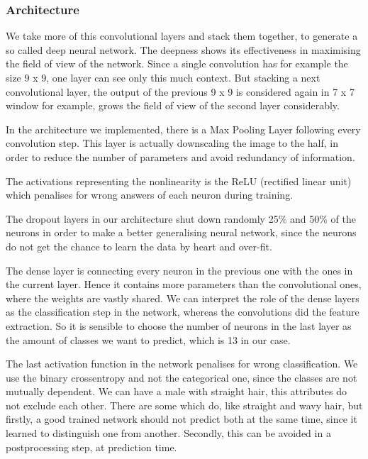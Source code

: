 \documentclass[12.5pt]{scrartcl}
\begin{document}
	\subsubsection{Architecture}
	We take more of this convolutional layers and stack them together, to generate a so called deep neural network. The deepness shows its effectiveness in maximising the field of view of the network. Since a single convolution has for example the size 9 x 9, one layer can see only this much context. But stacking a next convolutional layer, the output of the previous 9 x 9 is considered again in 7 x 7 window for example, grows the field of view of the second layer considerably.
	
	In the architecture we implemented, there is a Max Pooling Layer following every convolution step. This layer is actually downscaling the image to the half, in order to reduce the number of parameters and avoid redundancy of information.
	
	The activations representing the nonlinearity is the ReLU (rectified linear unit) which penalises for wrong answers of each neuron during training.
	
	The dropout layers in our architecture shut down randomly 25\% and 50\% of the neurons in order to make a better generalising neural network, since the neurons do not get the chance to learn the data by heart and over-fit.
	
	The dense layer is connecting every neuron in the previous one with the ones in the current layer. Hence it contains more parameters than the convolutional ones, where the weights are vastly shared. We can interpret the role of the dense layers as the classification step in the network, whereas the convolutions did the feature extraction. So it is sensible to choose the number of neurons in the last layer as the amount of classes we want to predict, which is 13 in our case.
	
	The last activation function in the network penalises for wrong classification. We use the binary crossentropy and not the categorical one, since the classes are not mutually dependent. We can have a male with straight hair, this attributes do not exclude each other. There are some which do, like straight and wavy hair, but firstly, a good trained network should not predict both at the same time, since it learned to distinguish one from another. Secondly, this can be avoided in a postprocessing step, at prediction time.
	
\end{document}
